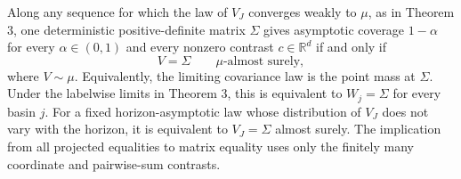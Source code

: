 Along any sequence for which the law of \(V_J\) converges weakly to \(\mu\), as in Theorem 3, one deterministic positive-definite matrix \(\Sigma\) gives asymptotic coverage \(1-\alpha\) for every \(\alpha\in(0,1)\) and every nonzero contrast \(c\in\mathbb R^d\) if and only if
\[
 V=\Sigma\qquad\mu\text{-almost surely},
\]
where \(V\sim\mu\). Equivalently, the limiting covariance law is the point mass at \(\Sigma\). Under the labelwise limits in Theorem 3, this is equivalent to \(W_j=\Sigma\) for every basin \(j\). For a fixed horizon-asymptotic law whose distribution of \(V_J\) does not vary with the horizon, it is equivalent to \(V_J=\Sigma\) almost surely. The implication from all projected equalities to matrix equality uses only the finitely many coordinate and pairwise-sum contrasts.